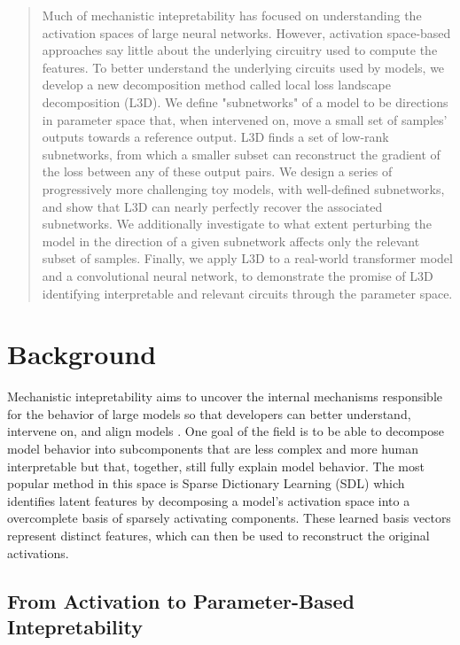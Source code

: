 \documentclass{article}
\theoremstyle{plain}
\theoremstyle{definition}
\theoremstyle{remark}
\begin{document}
\begin{abstract}
Much of mechanistic intepretability has focused on understanding the activation spaces of large neural networks. However, activation space-based approaches say little about the underlying circuitry used to compute the features. To better understand the underlying circuits used by models, we develop a new decomposition method called local loss landscape decomposition (L3D).  We define "subnetworks" of a model to be directions in parameter space that, when intervened on, move a small set of samples' outputs towards a reference output. L3D finds a set of low-rank subnetworks, from which a smaller subset can reconstruct the gradient of the loss between any of these  output pairs. We design a series of progressively more challenging toy models, with well-defined subnetworks, and show that L3D can nearly perfectly recover the associated subnetworks. We additionally investigate to what extent perturbing the model in the direction of a given subnetwork affects only the relevant subset of samples. Finally, we apply L3D to a real-world transformer model and a convolutional neural network, to demonstrate the promise of L3D identifying interpretable and relevant circuits through the parameter space. 

\end{abstract}

\section{Background}

Mechanistic intepretability aims to uncover the internal mechanisms responsible for the behavior of large models so that developers can better understand, intervene on, and align models \cite{bereska2024mechanistic}. One goal of the field is to be able to decompose model behavior into subcomponents that are less complex and more human interpretable but that, together, still fully explain model behavior. The most popular method in this space is Sparse Dictionary Learning (SDL) \cite{cunningham2023sparse,bricken2023towards,gao2024scaling} which identifies latent features by decomposing a model's activation space into a overcomplete basis of sparsely activating components. These learned basis vectors represent distinct features, which can then be used to reconstruct the original activations.


\subsection{From Activation to Parameter-Based Intepretability}\label{subsec:activation_to_parameter}
\end{document}
